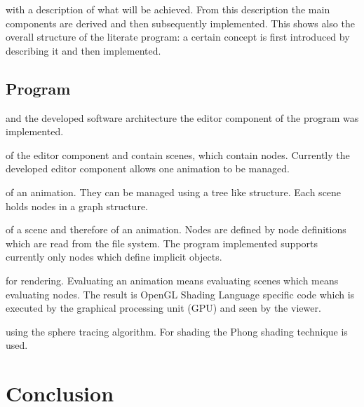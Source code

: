\documentclass[%
    a4paper,    %
    justified,  %
    nobib,      %
    openany     %
]{tufte-book}
\makeatletter
\renewcommand{\label}[1]{\@tufte@label{##1}}%
\makeatother
\begin{document}
 with a description of what will be
achieved. From this description the main components are derived and then
subsequently implemented. This shows also the overall structure of the literate
program: a certain concept is first introduced by describing it and then
implemented.

\subsection{Program}
\label{subsec:discussion-conclusion:discussion:program}

 and the developed software
architecture the editor component of the program was implemented.

 of the editor component and
contain scenes, which contain nodes. Currently the developed editor component
allows one animation to be managed.

 of an animation. They can be managed using a
tree like structure. Each scene holds nodes in a graph structure.

 of a scene and therefore of an
animation. Nodes are defined by node definitions which are read from the file
system. The program implemented supports currently only nodes which define
implicit objects.

 for rendering. Evaluating an animation means
evaluating scenes which means evaluating nodes. The result is OpenGL Shading
Language specific code which is executed by the graphical processing unit (GPU)
and seen by the viewer.

 using the sphere tracing algorithm. For shading
the Phong shading technique is used.

\section{Conclusion}
\label{sec:conclusion}

\end{document}
